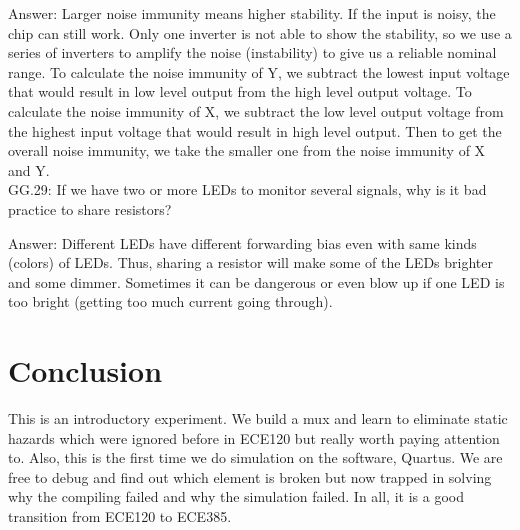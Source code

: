 \documentclass[12pt]{article}
\begin{document}
\noindent
Answer: Larger noise immunity means higher stability. If the input is noisy, the chip can still work. Only one inverter is not able to show the stability, so we use a series of inverters to amplify the noise (instability) to give us a reliable nominal range. To calculate the noise immunity of Y, we subtract the lowest input voltage that would result in low level output from the high level output voltage. To calculate the noise immunity of X, we subtract the low level output voltage from the highest input voltage that would result in high level output. Then to get the overall noise immunity, we take the smaller one from the noise immunity of X and Y. \\

\noindent
GG.29: If we have two or more LEDs to monitor several signals, why is it bad practice to share resistors?

\noindent
Answer: Different LEDs have different forwarding bias even with same kinds (colors) of LEDs. Thus, sharing a resistor will make some of the LEDs brighter and some dimmer. Sometimes it can be dangerous or even blow up if one LED is too bright (getting too much current going through).

\section{Conclusion}
This is an introductory experiment. We build a mux and learn to eliminate static hazards which were ignored before in ECE120 but really worth paying attention to. Also, this is the first time we do simulation on the software, Quartus. We are free to debug and find out which element is broken but now trapped in solving why the compiling failed and why the simulation failed. In all, it is a good transition from ECE120 to ECE385.

\newpage


\end{document}
